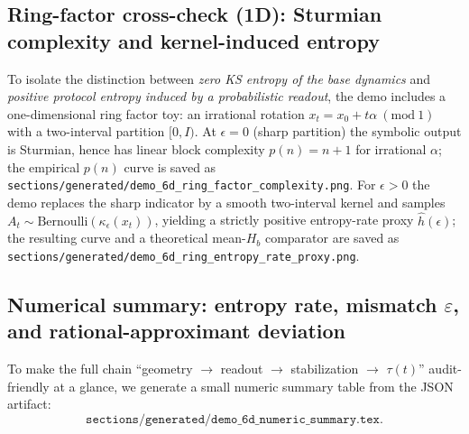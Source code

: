 \subsection{Ring-factor cross-check (1D): Sturmian complexity and kernel-induced entropy}\label{sec:worked-example:ring}
To isolate the distinction between \emph{zero KS entropy of the base dynamics} and \emph{positive protocol entropy induced by a probabilistic readout}, the demo includes a one-dimensional ring factor toy: an irrational rotation $x_t=x_0+t\alpha\ (\mathrm{mod}\ 1)$ with a two-interval partition $[0,I)$.
At $\epsilon=0$ (sharp partition) the symbolic output is Sturmian, hence has linear block complexity $p(n)=n+1$ for irrational $\alpha$; the empirical $p(n)$ curve is saved as \texttt{sections/generated/demo\_6d\_ring\_factor\_complexity.png}.
For $\epsilon>0$ the demo replaces the sharp indicator by a smooth two-interval kernel and samples $A_t\sim\mathrm{Bernoulli}(\kappa_\epsilon(x_t))$, yielding a strictly positive entropy-rate proxy $\widehat h(\epsilon)$; the resulting curve and a theoretical mean-$H_b$ comparator are saved as \texttt{sections/generated/demo\_6d\_ring\_entropy\_rate\_proxy.png}.

\subsection{Numerical summary: entropy rate, mismatch $\varepsilon$, and rational-approximant deviation}
To make the full chain ``geometry $\to$ readout $\to$ stabilization $\to$ $\tau(t)$'' audit-friendly at a glance, we generate a small numeric summary table from the JSON artifact:
\[
\texttt{sections/generated/demo\_6d\_numeric\_summary.tex}.
\]


